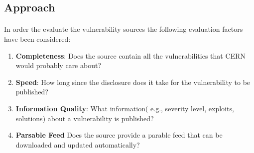 \subsection{Approach}
\paragraph{}
In order the evaluate the vulnerability sources the following evaluation factors have been considered:
\begin{enumerate}
\item \textbf{Completeness}: Does the source contain all the vulnerabilities that CERN would probably care about? 
\item \textbf{Speed}: How long since the disclosure does it take for the vulnerability to be published?
\item \textbf{Information Quality}: What information( e.g., severity level, exploits, solutions) about a vulnerability is published?
\item \textbf{Parsable Feed} Does the source provide a parable feed that can be downloaded and updated automatically?
\end{enumerate} 

